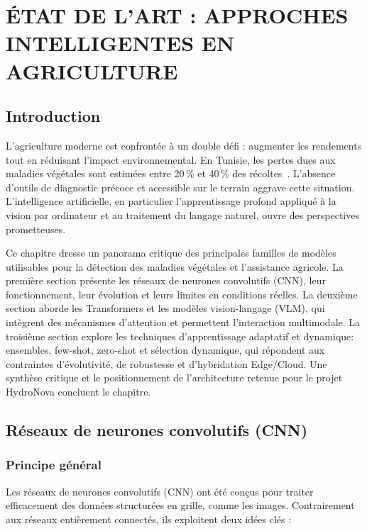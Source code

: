 \chapter{ÉTAT DE L'ART : APPROCHES INTELLIGENTES EN AGRICULTURE}

\section*{Introduction}

L'agriculture moderne est confrontée à un double défi : augmenter les rendements tout en réduisant l'impact environnemental. En Tunisie, les pertes dues aux maladies végétales sont estimées entre 20\,\% et 40\,\% des récoltes~\cite{fao2021report}. L'absence d'outils de diagnostic précoce et accessible sur le terrain aggrave cette situation. L'intelligence artificielle, en particulier l'apprentissage profond appliqué à la vision par ordinateur et au traitement du langage naturel, ouvre des perspectives prometteuses.


Ce chapitre dresse un panorama critique des principales familles de modèles utilisables pour la détection des maladies végétales et l'assistance agricole. La première section présente les réseaux de neurones convolutifs (CNN), leur fonctionnement, leur évolution et leurs limites en conditions réelles. La deuxième section aborde les Transformers et les modèles vision-langage (VLM), qui intègrent des mécanismes d'attention et permettent l'interaction multimodale. La troisième section explore les techniques d'apprentissage adaptatif et dynamique: ensembles, few-shot, zero-shot et sélection dynamique, qui répondent aux contraintes d'évolutivité, de robustesse et d'hybridation Edge/Cloud. Une synthèse critique et le positionnement de l'architecture retenue pour le projet HydroNova concluent le chapitre.
\newpage
\section{Réseaux de neurones convolutifs (CNN)}
\label{sec:c}

\subsection{Principe général}
Les réseaux de neurones convolutifs (CNN) ont été conçus pour traiter efficacement des données structurées en grille, comme les images. Contrairement aux réseaux entièrement connectés, ils exploitent deux idées clés :

